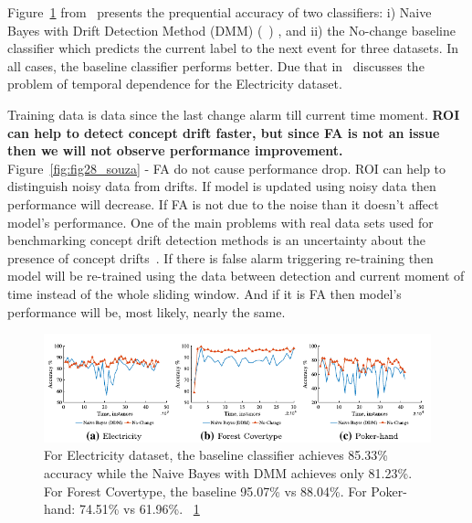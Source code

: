 Figure~\ref{fig:fig7_souza} from~\cite{SouzaRMB20} presents the prequential accuracy of two classifiers: i) Naive Bayes with Drift Detection Method (DMM) (~\cite{gama2004learning}) , and ii) the No-change baseline classifier which predicts the current label to the next event for three datasets. In all cases, the baseline classifier performs better.
Due that in~\cite{zliobaite2013good} discusses the problem of temporal dependence for the Electricity dataset.

Training data is data since the last change alarm till current time moment.
\textbf{ROI can help to detect concept drift faster, but since FA is not an issue then we will not observe performance improvement.}
Figure~\ref{fig:fig28_souza} - FA do not cause performance drop.
ROI can help to distinguish noisy data from drifts. If model is updated using noisy data then performance will decrease.
If FA is not due to the noise than it doesn't affect model's performance. 
One of the main problems with real data sets used for benchmarking concept drift detection methods is an uncertainty about the presence of concept drifts~\cite{SouzaRMB20}.
If there is false alarm triggering re-training then model will be re-trained using the data between detection and current moment of time instead of the whole sliding window.
And if it is FA then model's performance will be, most likely, nearly the same.

\begin{figure}[htb!]
	\centering
	\includegraphics[height=0.15\textheight]{images/images_cropped/souza_fig7}
	\caption{
For Electricity dataset, the baseline classifier achieves 85.33\% accuracy while the Naive Bayes with DMM achieves only 81.23\%. For Forest Covertype, the baseline 95.07\% vs 88.04\%. For Poker-hand: 74.51\% vs 61.96\%.
~\ref{fig:fig7_souza}
	}\label{fig:fig7_souza}
\end{figure}

